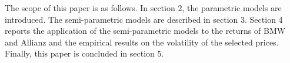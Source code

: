 The scope of this paper is as follows. In section 2, the parametric models are introduced. The semi-parametric models are described in section 3. Section 4 reports the application of the semi-parametric models to the returns of BMW and Allianz and the empirical results on the volatility of the selected prices. Finally, this paper is concluded in section 5.